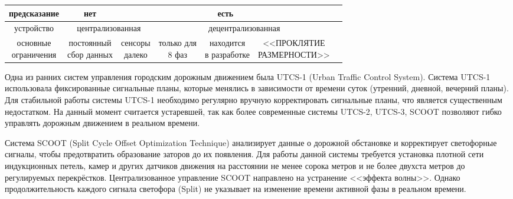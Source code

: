 \documentclass[11pt]{ubs}
\begin{document}
\begin{table}[h!]
{\begin{tabular}{|c||c|c|c|c|c|c|}
      предсказание      & нет                                   & \multicolumn{4}{c|}{есть}                                                                       \\ \hline
      устройство        & \multicolumn{2}{c|}{централизованная} & \multicolumn{3}{c|}{децентрализованная}                                                                                                                                                    \\ \hline
      \parbox{0.2\textwidth}{\centering\rule{0em}{1.2em}основные                                                                                                                                                                                             \\ограничения\rule[-0.5em]{0em}{1.2em}}   & \parbox{0.2\textwidth}{\centering\rule{0em}{1.2em}постоянный\\сбор данных} & \parbox{0.15\textwidth}{\centering \rule{0em}{1.2em}сенсоры \\далеко} & \parbox{0.2\textwidth}{\centering \rule{0em}{1.2em}только для\\  8 фаз}&  \parbox{0.2\textwidth}{\centering \rule{0em}{1.2em}находится \\в разработке} & \parbox{0.25\textwidth}{\centering <<ПРОКЛЯТИЕ\\РАЗМЕРНОСТИ>>} \\ \hline
    \end{tabular}
  }
\end{table}


Одна из ранних систем управления городским дорожным движением была UTCS-1 (Urban Traffic Control System)\cite{carini1977}. Система UTCS-1 использовала фиксированные сигнальные планы, которые менялись в зависимости от времени суток (утренний, дневной, вечерний планы). Для стабильной работы системы UTCS-1 необходимо  регулярно вручную корректировать сигнальные планы, что является существенным недостатком. На данный момент считается устаревшей, так как более современные системы UTCS-2, UTCS-3, SCOOT позволяют гибко управлять дорожным движением в реальном времени.

Система SCOOT (Split Cycle Offset Optimization Technique)\cite{chandler1985} анализирует данные о дорожной обстановке и корректирует светофорные сигналы, чтобы предотвратить образование заторов до их появления. Для работы данной системы требуется установка плотной сети индукционных петель, камер и других датчиков движения на расстоянии не менее  сорока метров и не более двухста метров до регулируемых перекрёстков. Централизованное управление SCOOT направлено на устранение <<эффекта волны>>. Однако продолжительность каждого сигнала светофора (Split) не указывает на изменение времени активной фазы в реальном времени.
\end{document}
